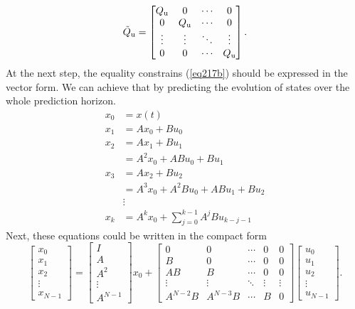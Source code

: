 \begin{equation}
\tilde{Q} _{\text{u}} = \begin{bmatrix}
Q _{\text{u}}&0&\cdots&0\\
0&Q _{\text{u}}&\cdots&0\\
\vdots&\vdots&\ddots&\vdots\\
0&0&\cdots&Q _{\text{u}}
\end{bmatrix}.
\end{equation}
At the next step, the equality constrains (\ref{eq217b}) should be expressed in the vector form. We can achieve that by predicting the evolution of states over the whole prediction horizon.
\begin{equation}
\begin{split}
x_0 &= x(t)\\
x_{1} &= Ax_0 + Bu_0\\
x_{2} &= Ax_{1} + Bu_{1}\\
&= A^2x_0 + ABu_0 + Bu_{1}\\
x_{3} &= Ax_{2} + Bu_{2}\\
&= A^3x_0 + A^2Bu_0 + ABu_{1} + Bu_{2}\\
&\vdots\\
x_{k} &= A^kx_0+\sum_{j=0}^{k-1}A^jBu_{k-j-1}
\end{split}
\end{equation}
Next, these equations could be written in the compact form
\begin{equation}
	\begin{bmatrix}
	x_0\\x_{1}\\ x_{2}\\\vdots\\ x_{N-1}
	\end{bmatrix} = 
	\begin{bmatrix}I\\A\\A^2\\ \vdots \\ A^{N-1}\end{bmatrix}x_0 + 
	\begin{bmatrix}
	0& 0&\cdots&0&0\\
	B&0&\cdots&0&0\\
	AB&B&\cdots&0&0\\
	\vdots&\vdots&\ddots&\vdots&\vdots\\
	A^{N-2}B&A^{N-3}B&\cdots&B&0\end{bmatrix}
	\begin{bmatrix}u_0\\u_{1}\\u_{2}\\\vdots\\u_{N-1}\end{bmatrix}.
\end{equation}
